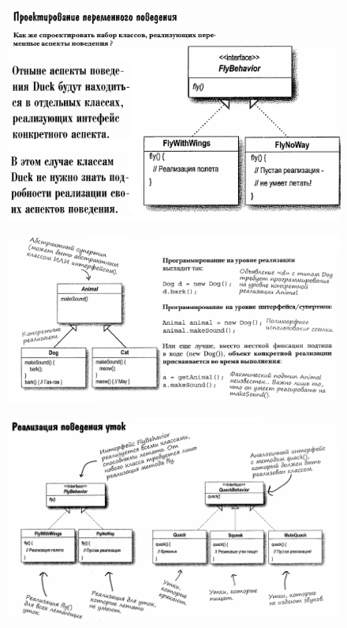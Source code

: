 \documentclass{beamer}
\begin{document}
\begin{frame}
\begin{figure}[h]
\centering
\includegraphics[scale=0.75]{images/lec09-pic11.png}
\label{pic-sort}
\end{figure}
\end{frame}

\begin{frame}
\begin{figure}[h]
\centering
\includegraphics[scale=0.45]{images/lec09-pic12.png}
\label{pic-sort}
\end{figure}
\end{frame}

\begin{frame}
\begin{figure}[h]
\centering
\includegraphics[scale=0.5]{images/lec09-pic13.png}
\label{pic-sort}
\end{figure}
\end{frame}
\end{document}
